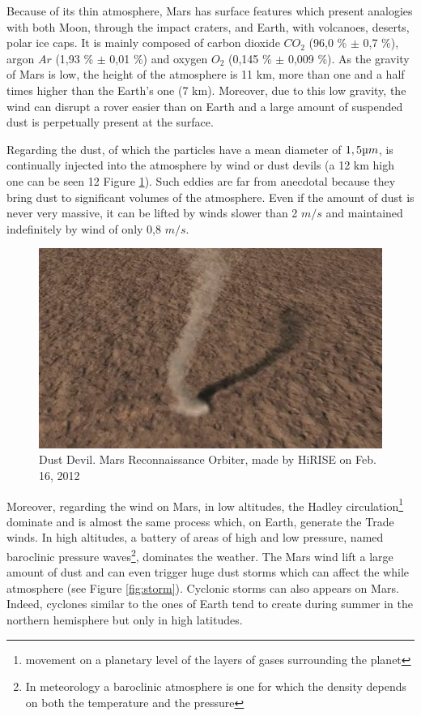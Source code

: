 Because of its thin atmosphere, Mars has surface features which present analogies with both Moon, through the impact craters, and Earth, with volcanoes, deserts, polar ice caps. It is mainly composed of carbon dioxide $CO_2$ (96,0 \% $\pm$ 0,7 \%), argon $Ar$ (1,93 \% $\pm$ 0,01 \%) and oxygen
$O_2$ (0,145 \% $\pm$ 0,009 \%). As the gravity of Mars is low, the height of the atmosphere is 11 km, more than one and a half times higher than the Earth's one (7 km). Moreover, due to this low gravity, the wind can disrupt a rover easier than on Earth and a large amount of suspended dust is perpetually present at the surface.

Regarding the dust, of which the particles have a mean diameter of $1,5 \micro m$, is continually injected into the atmosphere by wind or dust devils (a 12 km high one can be seen 12 Figure \ref{fig:poussiere}). Such eddies are far from anecdotal because they bring dust to significant volumes of the atmosphere. Even if the amount of dust is never very massive, it can be lifted by winds slower than 2 $m/s$ and maintained indefinitely by wind of only 0,8 $m/s$.

\begin{figure}[h]
  \centerline{\includegraphics[scale=0.6]{fig/poussiere.jpg}}
  \caption{Dust Devil. Mars Reconnaissance Orbiter, made by HiRISE on Feb. 16, 2012}
  \label{fig:poussiere}
\end{figure}

Moreover, regarding the wind on Mars, in low altitudes, the Hadley circulation\footnote{movement on a planetary level of the layers of gases surrounding the planet} dominate and is almost the same process which, on Earth, generate the Trade winds. In high altitudes, a battery of areas of high and low pressure, named baroclinic pressure waves\footnote{In meteorology a baroclinic atmosphere is one for which the density depends on both the temperature and the pressure}, dominates the weather. The Mars wind lift a large amount of dust and can even trigger huge dust storms which can affect the while atmosphere (see Figure \ref{fig:storm}). Cyclonic storms can also appears on Mars. Indeed, cyclones similar to the ones of Earth tend to create during summer in the northern hemisphere but only in high latitudes.

